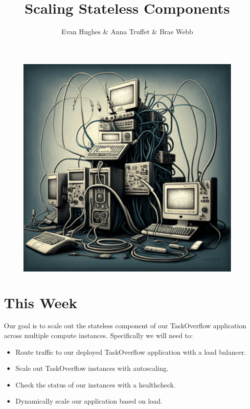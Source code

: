 \documentclass{csse4400}
\title{Scaling Stateless Components}
\author{Evan Hughes \& Anna Truffet \& Brae Webb }
\date{\week[practical]{6}}
\begin{document}
\maketitle

\begin{figure}[h]
    \begin{center}
        \includegraphics[scale=0.4]{images/scaling-out}
    \end{center}
\end{figure}

\section{This Week}
Our goal is to scale out the stateless component of our TaskOverflow application across multiple compute instances.
Specifically we will need to:
\begin{itemize}
    \item Route traffic to our deployed TaskOverflow application with a load balancer.
    \item Scale out TaskOverflow instances with autoscaling.
    \item Check the status of our instances with a healthcheck.
    \item Dynamically scale our application based on load.
\end{itemize}
\end{document}
